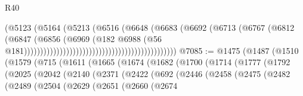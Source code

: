 \begin{lexlean}{R40}
\begin{coremodule}
                                                                    (@5123
                                                                      (@5164
                                                                        (@5213
                                                                          (@6516
                                                                            (@6648
                                                                              (@6683
                                                                                (@6692
                                                                                  (@6713
                                                                                    (@6767
                                                                                      (@6812
                                                                                        (@6847
                                                                                          (@6856
                                                                                            (@6969
                                                                                              (@182
                                                                                                @6988
                                                                                                (@56
                                                                                                  @181)))))))))))))))))))))))))))))))))))))))))))))))
@7085 := @1475
    (@1487
      (@1510
        (@1579
          (@715
            (@1611
              (@1665
                (@1674
                  (@1682
                    (@1700
                      (@1714
                        (@1777
                          (@1792
                            (@2025
                              (@2042
                                (@2140
                                  (@2371
                                    (@2422
                                      (@692
                                        (@2446
                                          (@2458
                                            (@2475
                                              (@2482
                                                (@2489
                                                  (@2504
                                                    (@2629
                                                      (@2651
                                                        (@2660
                                                          (@2674

\end{coremodule}
\end{lexlean}
